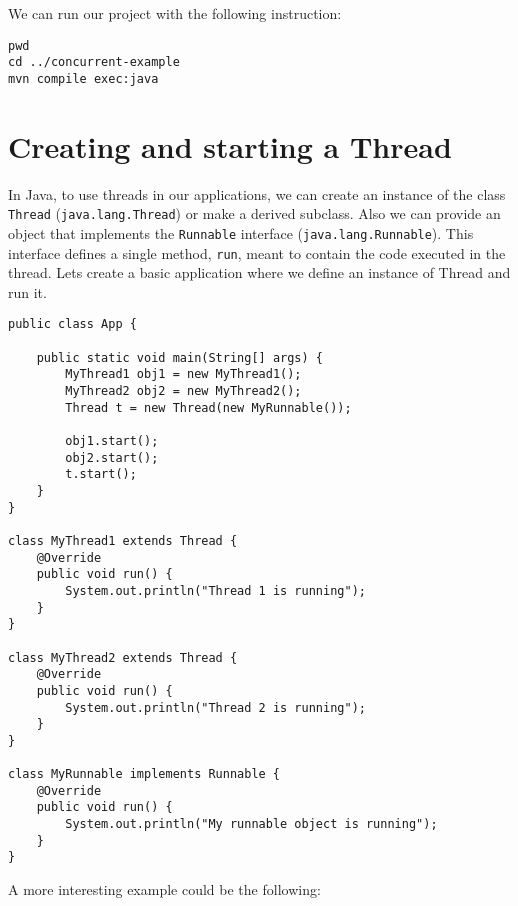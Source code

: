 \documentclass{latex/classes/myarticle}
\begin{document}
We can run our project with the following instruction:

\begin{lstlisting}
pwd
cd ../concurrent-example
mvn compile exec:java
\end{lstlisting}


\section{Creating and starting a Thread}
\label{sec:org121ae5f}

In Java, to use threads in our applications, we can create an instance of the
class \texttt{Thread} (\texttt{java.lang.Thread}) or make a derived subclass. Also we can
provide an object that implements the \texttt{Runnable} interface
(\texttt{java.lang.Runnable}). This interface defines a single method, \texttt{run}, meant to
contain the code executed in the thread. Lets create a basic application
where we define an instance of Thread and run it.

\begin{lstlisting}
public class App {

    public static void main(String[] args) {
        MyThread1 obj1 = new MyThread1();
        MyThread2 obj2 = new MyThread2();
        Thread t = new Thread(new MyRunnable());

        obj1.start();
        obj2.start();
        t.start();
    }
}

class MyThread1 extends Thread {
    @Override
    public void run() {
        System.out.println("Thread 1 is running");
    }
}

class MyThread2 extends Thread {
    @Override
    public void run() {
        System.out.println("Thread 2 is running");
    }
}

class MyRunnable implements Runnable {
    @Override
    public void run() {
        System.out.println("My runnable object is running");
    }
}
\end{lstlisting}

A more interesting example could be the following:
\end{document}
